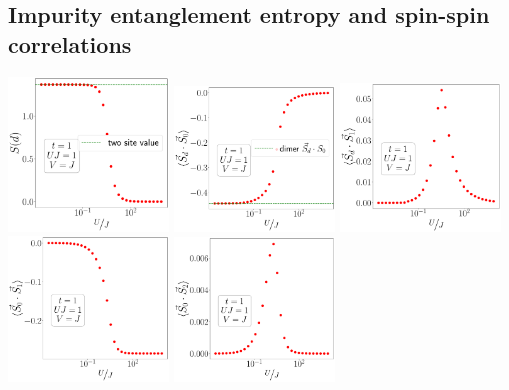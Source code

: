 \documentclass{report}
\numberwithin{equation}{section}
\begin{document}
\subsection*{Impurity entanglement entropy and spin-spin correlations}

\begin{center}
	\includegraphics[width=0.32\textwidth]{../figures/EE-d-t=1.000,J=1_over_U,V=J,N=6,U=0.016,91.116,32.pdf}
	\includegraphics[width=0.32\textwidth]{../figures/corr-d0-t=1.000,J=1_over_U,V=J,N=6,U=0.016,91.116,32.pdf}
	\includegraphics[width=0.32\textwidth]{../figures/corr-d1-t=1.000,J=1_over_U,V=J,N=6,U=0.016,91.116,32.pdf}
	\includegraphics[width=0.32\textwidth]{../figures/r-vec-corr-01-t=1.000,J=1_over_U,V=J,N=6,U=0.016,91.116,32.pdf}
	\includegraphics[width=0.32\textwidth]{../figures/r-vec-corr-02-t=1.000,J=1_over_U,V=J,N=6,U=0.016,91.116,32.pdf}

\end{center}
\end{document}
